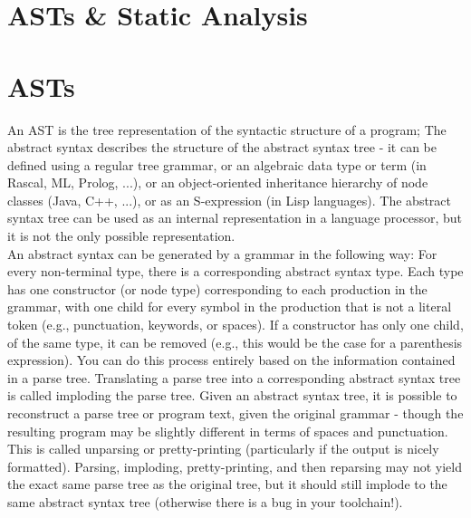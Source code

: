 \section{ASTs \& Static Analysis}
    \section{ASTs}
        An \gls{AST} is the tree representation of the syntactic structure of a program; The abstract syntax
        describes the structure of the abstract syntax tree - it can be defined using a
        regular tree grammar, or an algebraic data type or term (in Rascal, ML, Prolog,
        ...), or an object-oriented inheritance hierarchy of node classes (Java, C++, ...),
        or as an S-expression (in Lisp languages).
        The abstract syntax tree can be used as an internal representation in a language processor, 
        but it is not the only possible representation.\\
        An abstract syntax can be generated by a grammar in the following way:
        For every non-terminal type, there is a corresponding abstract syntax type.
        Each type has one constructor (or node type) corresponding to each production in the grammar, with one child for every symbol in the production that
        is not a literal token (e.g., punctuation, keywords, or spaces). If a constructor
        has only one child, of the same type, it can be removed (e.g., this would be
        the case for a parenthesis expression). You can do this process entirely based
        on the information contained in a parse tree. Translating a parse tree into a
        corresponding abstract syntax tree is called imploding the parse tree.
        Given an abstract syntax tree, it is possible to reconstruct a parse tree or program text, given the original grammar - though the resulting program may be
        slightly different in terms of spaces and punctuation. 
        \newpage
        This is called unparsing or
        pretty-printing (particularly if the output is nicely formatted). Parsing, imploding, pretty-printing, and then reparsing may not yield the exact same parse tree
        as the original tree, but it should still implode to the same abstract syntax tree (otherwise there is a bug in your toolchain!).

